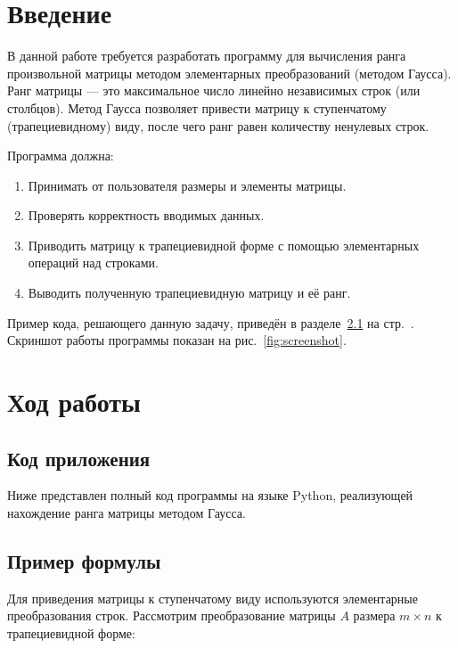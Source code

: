 \documentclass[12pt,a4paper]{scrartcl}
\begin{document}

\section{Введение}
\label{sec:intro}

В данной работе требуется разработать программу для вычисления ранга произвольной матрицы методом элементарных преобразований (методом Гаусса). Ранг матрицы — это максимальное число линейно независимых строк (или столбцов). Метод Гаусса позволяет привести матрицу к ступенчатому (трапециевидному) виду, после чего ранг равен количеству ненулевых строк.

Программа должна:
\begin{enumerate}
    \item Принимать от пользователя размеры и элементы матрицы.
    \item Проверять корректность вводимых данных.
    \item Приводить матрицу к трапециевидной форме с помощью элементарных операций над строками.
    \item Выводить полученную трапециевидную матрицу и её ранг.
\end{enumerate}

Пример кода, решающего данную задачу, приведён в разделе~\ref{sec:exp:code} на стр.~\pageref{sec:exp:code}. Скриншот работы программы показан на рис.~\ref{fig:screenshot}.

\section{Ход работы}
\label{sec:exp}

\subsection{Код приложения}
\label{sec:exp:code}

Ниже представлен полный код программы на языке Python, реализующей нахождение ранга матрицы методом Гаусса.



\subsection{Пример формулы}
\label{sec:mathexample}

Для приведения матрицы к ступенчатому виду используются элементарные преобразования строк. Рассмотрим преобразование матрицы $A$ размера $m \times n$ к трапециевидной форме:
\end{document}
